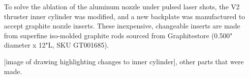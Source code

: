     To solve the ablation of the aluminum nozzle under pulsed laser shots, the V2 thruster inner cylinder was modified, and a new backplate was manufactured to accept graphite nozzle inserts. These inexpensive, changeable inserts are made from superfine iso-molded graphite rods sourced from Graphitestore (0.500" diameter x 12"L, SKU GT001685).

    [image of drawing highlighting changes to inner cylinder], other parts that were made.




    